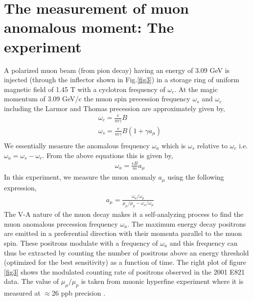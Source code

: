 \documentclass[journal,article,submit,moreauthors,pdftex,10pt,a4paper]{Definitions/mdpi}
\begin{document}
\section{The measurement of muon anomalous moment: The experiment}
A polarized muon beam (from pion decay) having an energy of 3.09 GeV is injected
(through the inflector shown in Fig.\ref{fig3}) in a storage ring of uniform magnetic field of 1.45 T 
with a cyclotron frequency of $\omega_c$. At the magic momentum of 3.09 GeV/c the muon spin precession frequency 
$\omega_s$ and $\omega_c$ including the Larmor and Thomas precession are approximately given by,
\begin{equation}
\begin{aligned}
&\omega{_c} = \frac{e}{m\gamma}B\\
&\omega{_s} = \frac{e}{m\gamma}B(1 + \gamma a_{\mu})\\
\end{aligned}
\end{equation}
We essentially measure the anomalous frequency $\omega_a$ which is $\omega_s$ relative to $\omega_c$
i.e. $\omega_a = \omega_s - \omega_c$. From the above equations this is given by,
\begin{equation}
\begin{aligned}
&\omega{_a} = \frac{eB}{m}a{_\mu} 
\end{aligned}
\end{equation}
In this experiment, we measure the muon anomaly $a_\mu$ using the following expression,
\begin{equation}
\begin{aligned}
& a_{\mu} = \frac {\omega_a/\omega_p} {\mu_{\mu}/\mu_p - \omega_a/\omega_p}
\end{aligned}
\end{equation}
The V-A nature of the muon decay makes it a self-analyzing process to find the muon anomalous precession  
frequency $\omega_a$. The maximum energy decay positrons are emitted in a preferential direction 
with their momenta parallel to the muon spin. These positrons modulate with a frequency of $\omega_a$ and 
this frequency can thus be extracted by counting the
number of positrons above an energy threshold (optimized for the best sensitivity) as a function of
time. The right plot of figure \ref{fig3} shows the modulated counting 
rate of positrons observed in the 2001 E821 data.
The value of $\mu_{\mu}/\mu_p$ is taken from muonic hyperfine experiment where it is measured  
at $\approx$26 ppb precision \cite{hyperfine_mu}.
\end{document}

